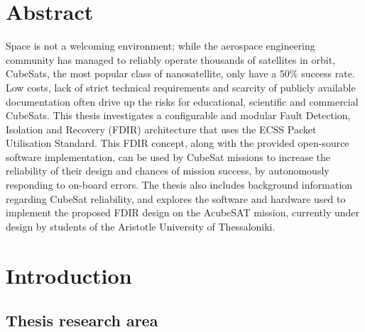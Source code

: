 \documentclass[a4paper,nobib]{tufte-book}
\begin{document}
\tableofcontents

\begin{fullwidth}
\listoffigures

\listoftables

\bgroup
\setlength\parskip{1ex}
\printacronyms[pages={display=all,seq/use=false},]
\egroup

\end{fullwidth}

\cleardoublepage

\chapter*{Abstract}

\justify
Space is not a welcoming environment; while the aerospace engineering community has managed to reliably operate thousands of satellites in orbit, CubeSats, the most popular class of nanosatellite, only have a 50\% success rate. Low costs, lack of strict technical requirements and scarcity of publicly available documentation often drive up the risks for educational, scientific and commercial CubeSats. This thesis investigates a configurable and modular Fault Detection, Isolation and Recovery (FDIR) architecture that uses the ECSS Packet Utilisation Standard. This FDIR concept, along with the provided open-source software implementation, can be used by CubeSat missions to increase the reliability of their design and chances of mission success, by autonomously responding to on-board errors. The thesis also includes background information regarding CubeSat reliability, and explores the software and hardware used to implement the proposed FDIR design on the AcubeSAT mission, currently under design by students of the Aristotle University of Thessaloniki.

\mainmatter


\chapter{Introduction}

\section{Thesis research area}
\end{document}
